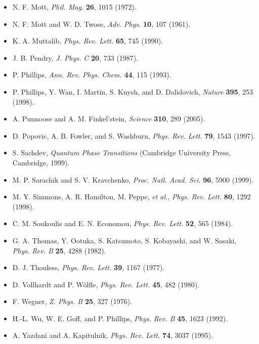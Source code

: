 \begin{itemize}[leftmargin=2em,itemsep=0pt,parsep=0pt,label={}]
\item [M1972] N. F. Mott, \emph{Phil. Mag.} \textbf{26}, 1015 (1972).
\item [MT1961] N. F. Mott and W. D. Twose, \emph{Adv. Phys.} \textbf{10}, 107 (1961).
\item [M1990] K. A. Muttalib, \emph{Phys. Rev. Lett.} \textbf{65}, 745 (1990).
\item [P1987] J. B. Pendry, \emph{J. Phys. C} \textbf{20}, 733 (1987).
\item [P1993] P. Phillips, \emph{Ann. Rev. Phys. Chem.} \textbf{44}, 115 (1993).
\item [P1998] P. Phillips, Y. Wan, I. Martin, S. Knysh, and D. Dalidovich, \emph{Nature} \textbf{395}, 253 (1998).
\item [PF2005] A. Punnoose and A. M. Finkel'stein, \emph{Science} \textbf{310}, 289 (2005).
\item [PFW1997] D. Popovic, A. B. Fowler, and S. Washburn, \emph{Phys. Rev. Lett.} \textbf{79}, 1543 (1997).
\item [S1999] S. Sachdev, \emph{Quantum Phase Transitions} (Cambridge University Press, Cambridge, 1999).
\item [SK1999] M. P. Sarachik and S. V. Kravchenko, \emph{Proc. Natl. Acad. Sci.} \textbf{96}, 5900 (1999).
\item [S1998] M. Y. Simmons, A. R. Hamilton, M. Peppe, \emph{et al.}, \emph{Phys. Rev. Lett.} \textbf{80}, 1292 (1998).
\item [SE1984] C. M. Soukoulis and E. N. Economou, \emph{Phys. Rev. Lett.} \textbf{52}, 565 (1984).
\item [T1982] G. A. Thomas, Y. Ootuka, S. Katsumoto, S. Kobayashi, and W. Sasaki, \emph{Phys. Rev. B} \textbf{25}, 4288 (1982).
\item [T1977] D. J. Thouless, \emph{Phys. Rev. Lett.} \textbf{39}, 1167 (1977).
\item [VW1980] D. Vollhardt and P. W\"{o}lfle, \emph{Phys. Rev. Lett.} \textbf{45}, 482 (1980).
\item [W1976] F. Wegner, \emph{Z. Phys. B} \textbf{25}, 327 (1976).
\item [WGP1992] H.-L. Wu, W. E. Goff, and P. Phillips, \emph{Phys. Rev. B} \textbf{45}, 1623 (1992).
\item [YK1995] A. Yazdani and A. Kapitulnik, \emph{Phys. Rev. Lett.} \textbf{74}, 3037 (1995).
\end{itemize}
